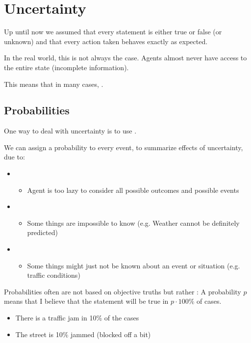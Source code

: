 \documentclass[
../../EiKI_Summary.tex,
]
{subfiles}
\begin{document}
\section{Uncertainty}
Up until now we assumed that every statement is either true or false (or unknown) and that every action taken behaves exactly as expected.

In the real world, this is not always the case. Agents almost never have access to the entire state (incomplete information). 

This means that in many cases, .

\subsection{Probabilities}
One way to deal with uncertainty is to use . 

We can assign a probability to every event, to summarize effects of uncertainty, due to:
\begin{itemize}
    \item {}
    \begin{itemize}
        \item Agent is too lazy to consider all possible outcomes and possible events
    \end{itemize}
    \item {}
    \begin{itemize}
        \item Some things are impossible to know (e.g. Weather cannot be definitely predicted)
    \end{itemize}
    \item {}
    \begin{itemize}
        \item Some things might just not be known about an event or situation (e.g. traffic conditions)
    \end{itemize}
\end{itemize}

Probabilities often are not based on objective truths but rather : A probability $p$ means that I believe that the statement will be true in $p \cdot 100\%$ of cases.

\begin{itemize}
    \item {} There is a traffic jam in 10\% of the cases
    \item {} The street is 10\% jammed (blocked off a bit) 
\end{itemize}
\end{document}
